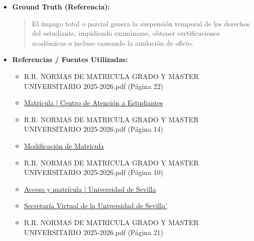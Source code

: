 \documentclass[12pt,a4paper,oneside]{report}
\begin{document}
\begin{itemize}
\begin{itemize}
\begin{quote}
Es importante destacar que, para evitar estas consecuencias, es fundamental realizar los pagos de la matrícula en las fechas establecidas y comunicarse con la \textbf{Secretaría Virtual} o el centro correspondiente en caso de cualquier incidencia o duda.
                \end{quote}
          \item \textbf{{Ground Truth (Referencia):}} \\
                \begin{quote}
El impago total o parcial genera la suspensión temporal de los derechos del estudiante, impidiendo examinarse, obtener certificaciones académicas o incluso causando la anulación de oficio.
                \end{quote}
          \item \textbf{{Referencias / Fuentes Utilizadas:}} \\
                \begin{itemize}
                  \item R.R. NORMAS DE MATRICULA GRADO Y MASTER UNIVERSITARIO 2025-2026.pdf (Página 22)
                  \item \href{https://cat.us.es/matricula}{Matrícula | Centro de Atención a Estudiantes}
                  \item R.R. NORMAS DE MATRICULA GRADO Y MASTER UNIVERSITARIO 2025-2026.pdf (Página 14)
                  \item \href{https://www.eii.us.es/index.php/secretaria/matricula/modificacion-de-matricula}{Modificación de Matrícula}
                  \item R.R. NORMAS DE MATRICULA GRADO Y MASTER UNIVERSITARIO 2025-2026.pdf (Página 10)
                  \item \href{https://www.us.es/estudiar/acceso-matricula}{Acceso y matrícula | Universidad de Sevilla}
                  \item \href{https://auto-matricula.us.es/}{Secretaría Virtual de la Universidad de Sevilla'}
                  \item R.R. NORMAS DE MATRICULA GRADO Y MASTER UNIVERSITARIO 2025-2026.pdf (Página 21)
                \end{itemize}
        \end{itemize}


\end{itemize}
\end{document}
